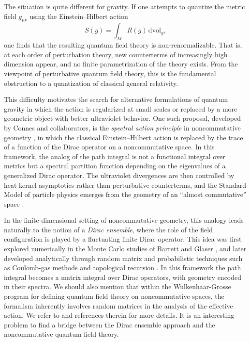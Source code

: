 \documentclass[11pt]{article}
\theoremstyle{plain}
\begin{document}
The situation is quite different for gravity. If one attempts to quantize the metric field $g_{\mu\nu}$ using 
the Einstein--Hilbert action
\[
S(g) = \int_M R(g)\, \mathrm{dvol}_g,
\]
one finds that the resulting quantum field theory is non-renormalizable. That is, at each order of perturbation theory,
new counterterms of increasingly high dimension appear, and no finite parametrization of the theory exists.
From the viewpoint of perturbative quantum field theory, this is the fundamental obstruction to a
 quantization of classical general relativity.

This difficulty motivates the search for alternative formulations of quantum gravity in which the action is 
regularized at small scales or replaced by a more geometric object with better ultraviolet behavior. One such
proposal, developed by Connes and collaborators, is the \emph{spectral action principle} in noncommutative
geometry \cite{Spectral action, Neutrino Mixing, ConnesRecon}, in which the classical Einstein--Hilbert action is replaced by the trace of a function of the Dirac
operator on a noncommutative space. In this framework, the analog of the path integral is not a functional
integral over metrics but a spectral partition function depending on the eigenvalues of a generalized Dirac
operator. The ultraviolet divergences are then controlled by heat kernel asymptotics rather than perturbative
counterterms, and the Standard Model of particle physics emerges from the geometry of an ``almost commutative''
space \cite{Connes-Lott, QFTNCG, VS}.

\medskip
In the finite-dimensional setting of noncommutative geometry, this analogy leads naturally to the notion of a \emph{Dirac ensemble}, where the role of the field configuration is played by a fluctuating finite Dirac operator. This idea was first explored numerically in the Monte Carlo studies of Barrett and Glaser \cite{Barrett2016, glaser, truncated 1, truncated 2}, and later developed analytically through random matrix and probabilistic techniques such as Coulomb-gas methods and topological recursion \cite{Khalkhali2020, Khalkhali2022, hessam2023double,AKHZ}. In this framework the path integral becomes a matrix integral over Dirac operators, with geometry encoded in their 
spectra. We should also mention that  within the Wulkenhaar-Grosse program for defining quantum field theory on noncommutative spaces, the formalism inherently involves random matrices in the analysis of the effective 
action. We refer to \cite{Wulkenhaar} and references therein for more details. It is an interesting problem to find a bridge between the Dirac ensemble approach and the noncommutative quantum field theory. 
\end{document}
